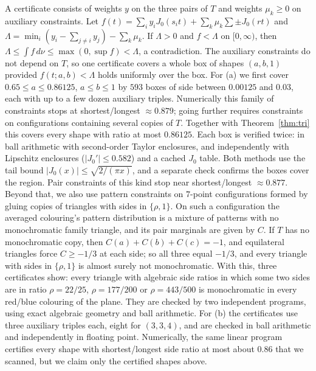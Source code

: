 \documentclass[11pt]{amsart}
\theoremstyle{definition}
\begin{document}
A certificate consists of weights $y$ on the three pairs of $T$ and weights $\mu_k\ge0$ on auxiliary constraints. Let $f(t)=\sum_i y_iJ_0(s_it)+\sum_k\mu_k\sum\pm J_0(r t)$ and $\Lambda=\min_i(y_i-\sum_{j\ne i}y_j)-\sum_k\mu_k$. If $\Lambda>0$ and $f<\Lambda$ on $[0,\infty)$, then $\Lambda\le\int f\,d\nu\le\max(0,\sup f)<\Lambda$, a contradiction. The auxiliary constraints do not depend on $T$, so one certificate covers a whole box of shapes $(a,b,1)$ provided $f(t;a,b)<\Lambda$ holds uniformly over the box. For (a) we first cover $0.65\le a\le0.86125$, $a\le b\le1$ by $593$ boxes of side between $0.00125$ and $0.03$, each with up to a few dozen auxiliary triples. Numerically this family of constraints stops at shortest/longest $\approx0.879$; going further requires constraints on configurations containing several copies of $T$. Together with Theorem~\ref{thm:tri} this covers every shape with ratio at most $0.86125$. Each box is verified twice: in ball arithmetic with second-order Taylor enclosures, and independently with Lipschitz enclosures ($|J_0'|\le0.582$) and a cached $J_0$ table. Both methods use the tail bound $|J_0(x)|\le\sqrt{2/(\pi x)}$, and a separate check confirms the boxes cover the region. Pair constraints of this kind stop near shortest/longest $\approx0.877$. Beyond that, we also use pattern constraints on $7$-point configurations formed by gluing copies of triangles with sides in $\{\rho,1\}$. On such a configuration the averaged colouring's pattern distribution is a mixture of patterns with no monochromatic family triangle, and its pair marginals are given by $C$. If $T$ has no monochromatic copy, then $C(a)+C(b)+C(c)=-1$, and equilateral triangles force $C\ge-1/3$ at each side; so all three equal $-1/3$, and every triangle with sides in $\{\rho,1\}$ is almost surely not monochromatic. With this, three certificates show: every triangle with algebraic side ratios in which some two sides are in ratio $\rho=22/25$, $\rho=177/200$ or $\rho=443/500$ is monochromatic in every red/blue colouring of the plane. They are checked by two independent programs, using exact algebraic geometry and ball arithmetic. For (b) the certificates use three auxiliary triples each, eight for $(3,3,4)$, and are checked in ball arithmetic and independently in floating point. Numerically, the same linear program certifies every shape with shortest/longest side ratio at most about $0.86$ that we scanned, but we claim only the certified shapes above.
\end{document}

